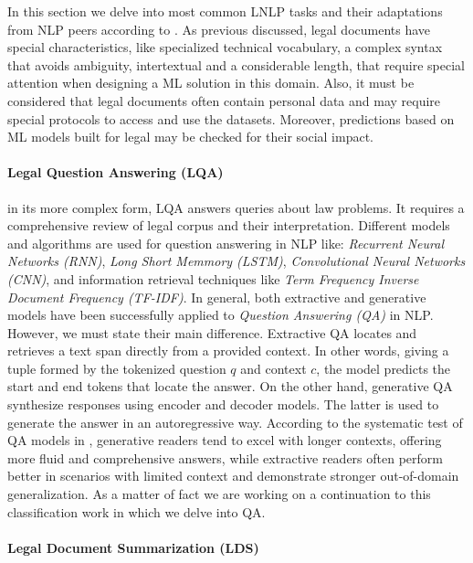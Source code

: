 \documentclass[onecolumn, journal, english, 12pt, a4paper]{IEEEtran} %
\theoremstyle{definition}
\begin{document}
In this section we delve into most common LNLP tasks and their
adaptations from NLP peers according to \cite{Ariai2024}. As previous
discussed, legal documents have special characteristics, like
specialized technical vocabulary, a complex syntax that avoids
ambiguity, intertextual and a considerable length, that require
special attention when designing a ML solution in this domain. Also,
it must be considered that legal documents often contain personal data
and may require special protocols to access and use the
datasets. Moreover, predictions based on ML models built for legal may
be checked for their social impact.


\paragraph{Legal Question Answering (LQA)}
in its more complex form, LQA answers queries about law problems. It
requires a comprehensive review of legal corpus and their
interpretation\cite{Ariai2024}. Different models and algorithms are
used for question answering in NLP like: \textit{Recurrent Neural
  Networks (RNN)}, \textit{Long Short Memmory (LSTM)},
\textit{Convolutional Neural Networks (CNN)}, and information
retrieval techniques like \textit{Term Frequency Inverse Document
  Frequency (TF-IDF)}. In general, both extractive and generative
models have been successfully applied to \textit{Question Answering
  (QA)} in NLP\cite{Luo2022NLP}. However, we must state their main
difference. Extractive QA locates and retrieves a text span directly
from a provided context. In other words, giving a tuple formed by the
tokenized question $q$ and context $c$, the model predicts the start
and end tokens that locate the answer. On the other hand, generative
QA synthesize responses using encoder and decoder models. The latter
is used to generate the answer in an autoregressive
way\cite{Luo2022NLP}. According to the systematic test of QA models in
\cite{Luo2022NLP}, generative readers tend to excel with longer
contexts, offering more fluid and comprehensive answers, while
extractive readers often perform better in scenarios with limited
context and demonstrate stronger out-of-domain generalization. As a
matter of fact we are working on a continuation to this classification
work in which we delve into QA.

\paragraph{Legal Document Summarization (LDS)}
\end{document}
